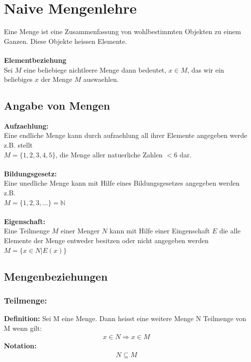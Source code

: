 \documentclass[../AbiMappe_Mathe.tex]{subfiles}
\begin{document}
\theoremstyle{nonumberplain}



\section{Naive Mengenlehre}
Eine Menge ist eine Zusammenfassung von wohlbestimmten Objekten zu einem Ganzen.
Diese Objekte heissen Elemente.\\\\
\textbf{Elementbeziehung}\\
Sei $M$ eine beliebiege nichtleere Menge dann bedeutet, $x \in M$, das wir ein beliebiges $x$ der Menge $M$ auswaehlen.

\subsection{Angabe von Mengen}
\textbf{Aufzaehlung:}\\
Eine endliche Menge kann durch aufzaehlung all ihrer Elemente angegeben werde z.B. stellt\\ $M=\{1,2,3,4,5\}$, die Menge aller natuerliche Zahlen $<6$ dar.\\\\
\textbf{Bildungsgesetz:}\\
Eine unedliche Menge kann mit Hilfe eines Bildungsgesetzes angegeben werden z.B. \\$M=\{1,2,3,\dots\}=\mathbb{N}$\\\\
\textbf{Eigenschaft:}\\
Eine Teilmenge $M$ einer Menger $N$ kann mit Hilfe einer Eingenschaft $E$ die alle Elemente der Menge entweder besitzen oder nicht angegeben werden $M=\{x \in N|E(x)\}$

\subsection{Mengenbeziehungen}

\subsubsection{Teilmenge:}
\textbf{Definition:} Sei M eine Menge. Dann heisst eine weitere Menge N Teilmenge von M wenn gilt:
\begin{align*}
x \in N \Rightarrow x \in M
\end{align*}
\textbf{Notation:} 
\begin{align*}
N \subseteq M
\end{align*}
\end{document}

